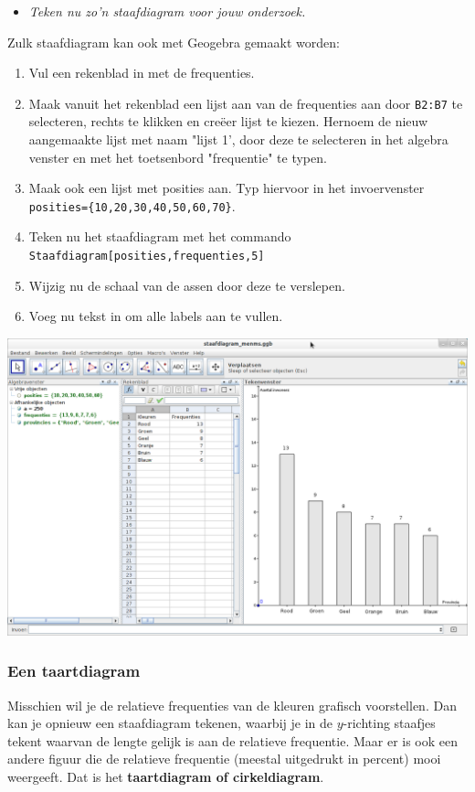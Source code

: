 \documentclass[11pt]{article}
\newcommand{\vraag}[2]{\begin{itemize}\item {\it #1} \vspace*{#2}\end{itemize}}
\begin{document}
\vraag{Teken nu zo’n staafdiagram voor jouw onderzoek.}{0cm}
\begin{center}

\end{center}

Zulk staafdiagram kan ook met Geogebra gemaakt worden:
\begin{enumerate}
  \item Vul een rekenblad in met de frequenties.
  \item Maak vanuit het rekenblad een lijst aan van de frequenties aan door \verb#B2:B7# te selecteren, rechts te klikken en creëer lijst te kiezen. Hernoem de nieuw aangemaakte lijst met naam "lijst 1', door deze te selecteren in het algebra venster en met het toetsenbord "frequentie" te typen.
  \item Maak ook een lijst met posities aan. Typ hiervoor in het invoervenster\\
  \verb$posities={10,20,30,40,50,60,70}$.
  \item Teken nu het staafdiagram met het commando \verb$Staafdiagram[posities,frequenties,5]$
  \item Wijzig nu de schaal van de assen door deze te verslepen.
  \item Voeg nu tekst in om alle labels aan te vullen.
\end{enumerate}

\begin{center}
  \includegraphics[width=14cm]{gg-staafdiagram_menms}
\end{center}

\subsubsection*{Een taartdiagram}
Misschien wil je de relatieve frequenties van de kleuren grafisch voorstellen. Dan kan je opnieuw een
staafdiagram tekenen, waarbij je in de $y$-richting staafjes tekent waarvan de lengte gelijk is aan de
relatieve frequentie.
Maar er is ook een andere figuur die de relatieve frequentie (meestal uitgedrukt in percent) mooi
weergeeft. Dat is het {\bf taartdiagram of cirkeldiagram}.
\end{document}
